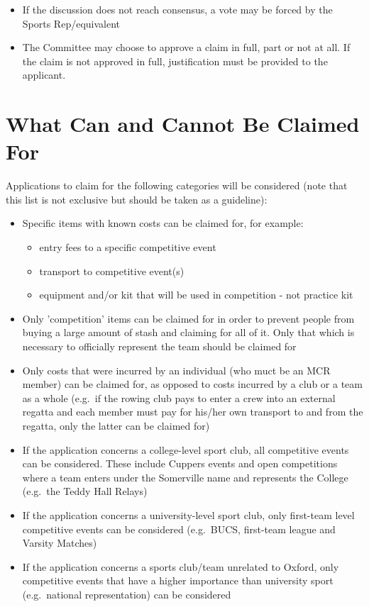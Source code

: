 \begin{itemize}
	\item If the discussion does not reach consensus, a vote may be forced by the Sports Rep/equivalent
	\item The Committee may choose to approve a claim in full, part or not at all. If the claim is not approved in full, justification must be provided to the applicant.
\end{itemize}

\section{What Can and Cannot Be Claimed For}
Applications to claim for the following categories will be considered (note that this list is not exclusive but should be taken as a guideline):
\begin{itemize}
	\item Specific items with known costs can be claimed for, for example:
	\begin{itemize}
		\item entry fees to a specific competitive event
		\item transport to competitive event(s)
		\item equipment and/or kit that will be used in competition - not practice kit
	\end{itemize}
	\item Only 'competition' items can be claimed for in order to prevent people from buying a large amount of stash and claiming for all of it. Only that which is necessary to officially represent the team should be claimed for
	\item Only costs that were incurred by an individual (who muct be an MCR member) can be claimed for, as opposed to costs incurred by a club or a team as a whole (e.g.\ if the rowing club pays to enter a crew into an external regatta and each member must pay for his/her own transport to and from the regatta, only the latter can be claimed for)
	\item If the application concerns a college-level sport club, all competitive events can be considered. These include Cuppers events and open competitions where a team enters under the Somerville name and represents the College (e.g.\ the Teddy Hall Relays)
	\item If the application concerns a university-level sport club, only first-team level competitive events can be considered (e.g.\ BUCS, first-team league and Varsity Matches)
	\item If the application concerns a sports club/team unrelated to Oxford, only competitive events that have a higher importance than university sport (e.g.\ national representation) can be considered

\end{itemize}
